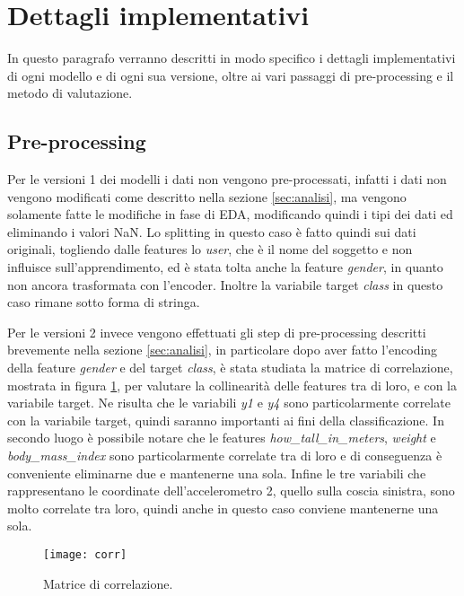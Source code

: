 \section{Dettagli implementativi}\label{sec:implementazione}
In questo paragrafo verranno descritti in modo specifico i dettagli implementativi di ogni modello e di ogni sua versione, oltre ai vari passaggi di pre-processing e il metodo di valutazione.

\subsection{Pre-processing}\label{subsec:prepr}
Per le versioni 1 dei modelli i dati non vengono pre-processati, infatti i dati non vengono modificati come descritto nella sezione \ref{sec:analisi}, ma vengono solamente fatte le modifiche in fase di EDA, modificando quindi i tipi dei dati ed eliminando i valori NaN. Lo splitting in questo caso è fatto quindi sui dati originali, togliendo dalle features lo \textit{user}, che è il nome del soggetto e non influisce sull'apprendimento, ed è stata tolta anche la feature \textit{gender}, in quanto non ancora trasformata con l'encoder. Inoltre la variabile target \textit{class} in questo caso rimane sotto forma di stringa.

Per le versioni 2 invece vengono effettuati gli step di pre-processing descritti brevemente nella sezione \ref{sec:analisi}, in particolare dopo aver fatto l'encoding della feature \textit{gender} e del target \textit{class}, è stata studiata la matrice di correlazione, mostrata in figura \ref{fig:corr}, per valutare la collinearità delle features tra di loro, e con la variabile target. Ne risulta che le variabili \textit{y1} e \textit{y4} sono particolarmente correlate con la variabile target, quindi saranno importanti ai fini della classificazione. In secondo luogo è possibile notare che le features \textit{how\_tall\_in\_meters}, \textit{weight} e \textit{body\_mass\_index} sono particolarmente correlate tra di loro e di conseguenza è conveniente eliminarne due e mantenerne una sola. Infine le tre variabili che rappresentano le coordinate dell'accelerometro 2, quello sulla coscia sinistra, sono molto correlate tra loro, quindi anche in questo caso conviene mantenerne una sola.

\begin{figure}[ht]
    \centering\texttt{[image: corr]}
    \caption{Matrice di correlazione.}
    \label{fig:corr}
\end{figure}

